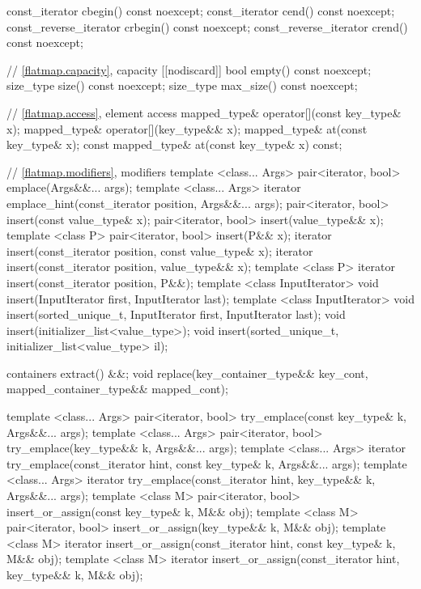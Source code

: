 \begin{codeblock}
\begin{codeblock}
\begin{codeblock}
\begin{addedblock}
\begin{codeblock}
{{      const_iterator          cbegin() const noexcept;
      const_iterator          cend() const noexcept;
      const_reverse_iterator  crbegin() const noexcept;
      const_reverse_iterator  crend() const noexcept;

      // \ref{flatmap.capacity}, capacity
      [[nodiscard]] bool empty() const noexcept;
      size_type size() const noexcept;
      size_type max_size() const noexcept;

      // \ref{flatmap.access}, element access
      mapped_type& operator[](const key_type& x);
      mapped_type& operator[](key_type&& x);
      mapped_type& at(const key_type& x);
      const mapped_type& at(const key_type& x) const;

      // \ref{flatmap.modifiers}, modifiers
      template <class... Args> pair<iterator, bool> emplace(Args&&... args);
      template <class... Args>
        iterator emplace_hint(const_iterator position, Args&&... args);
      pair<iterator, bool> insert(const value_type& x);
      pair<iterator, bool> insert(value_type&& x);
      template <class P> pair<iterator, bool> insert(P&& x);
      iterator insert(const_iterator position, const value_type& x);
      iterator insert(const_iterator position, value_type&& x);
      template <class P>
        iterator insert(const_iterator position, P&&);
      template <class InputIterator>
        void insert(InputIterator first, InputIterator last);
      template <class InputIterator>
        void insert(sorted_unique_t, InputIterator first, InputIterator last);
      void insert(initializer_list<value_type>);
      void insert(sorted_unique_t, initializer_list<value_type> il);

      containers extract() &&;
      void replace(key_container_type&& key_cont, mapped_container_type&& mapped_cont);

      template <class... Args>
        pair<iterator, bool> try_emplace(const key_type& k, Args&&... args);
      template <class... Args>
        pair<iterator, bool> try_emplace(key_type&& k, Args&&... args);
      template <class... Args>
        iterator try_emplace(const_iterator hint, const key_type& k,
                             Args&&... args);
      template <class... Args>
        iterator try_emplace(const_iterator hint, key_type&& k, Args&&... args);
      template <class M>
        pair<iterator, bool> insert_or_assign(const key_type& k, M&& obj);
      template <class M>
        pair<iterator, bool> insert_or_assign(key_type&& k, M&& obj);
      template <class M>
        iterator insert_or_assign(const_iterator hint, const key_type& k,
                                  M&& obj);
      template <class M>
        iterator insert_or_assign(const_iterator hint, key_type&& k, M&& obj);

}}
\end{codeblock}
\end{addedblock}
\end{codeblock}
\end{codeblock}
\end{codeblock}
